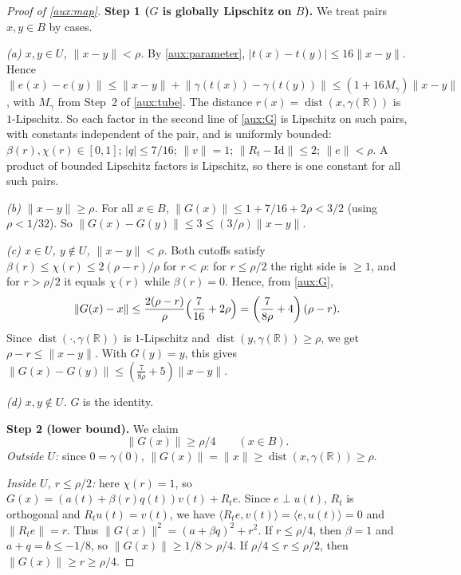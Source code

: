 \documentclass[11pt]{article}
\newcommand{\R}{\mathbb R}
\newcommand{\norm}[1]{\lVert #1\rVert}
\newcommand{\ip}[2]{\langle #1,#2\rangle}
\DeclareMathOperator{\dist}{dist}
\theoremstyle{definition}
\numberwithin{equation}{section}
\newcommand{\step}[1]{\par\smallskip\noindent\textbf{Step #1.}\enspace}
\begin{document}
\begin{proof}[Proof of \cref{aux:map}]
\step{1 (\(G\) is globally Lipschitz on \(B\))}
We treat pairs \(x,y\in B\) by cases.

\emph{(a) \(x,y\in U\), \(\norm{x-y}<\rho\).} By \eqref{aux:parameter},
\(|t(x)-t(y)|\le16\norm{x-y}\). Hence
\(\norm{e(x)-e(y)}\le\norm{x-y}+\norm{\gamma(t(x))-\gamma(t(y))}
\le(1+16M_\gamma)\norm{x-y}\), with \(M_\gamma\) from Step~2 of
\cref{aux:tube}. The distance \(r(x)=\dist(x,\gamma(\R))\) is
\(1\)-Lipschitz. So each factor in the second line of \eqref{aux:G} is
Lipschitz on such pairs, with constants independent of the pair, and is
uniformly bounded: \(\beta(r),\chi(r)\in[0,1]\); \(|q|\le7/16\);
\(\norm v=1\); \(\norm{R_t-\mathrm{Id}}\le2\); \(\norm e<\rho\). A product
of bounded Lipschitz factors is Lipschitz, so there is one constant for all
such pairs.

\emph{(b) \(\norm{x-y}\ge\rho\).} For all \(x\in B\),
\(\norm{G(x)}\le1+7/16+2\rho<3/2\) (using \(\rho<1/32\)). So
\(\norm{G(x)-G(y)}\le3\le(3/\rho)\norm{x-y}\).

\emph{(c) \(x\in U\), \(y\notin U\), \(\norm{x-y}<\rho\).}
Both cutoffs satisfy \(\beta(r)\le\chi(r)\le2(\rho-r)/\rho\) for
\(r<\rho\): for \(r\le\rho/2\) the right side is \(\ge1\), and for
\(r>\rho/2\) it equals \(\chi(r)\) while \(\beta(r)=0\). Hence, from
\eqref{aux:G},
\[
 \norm{G(x)-x}\le\frac{2(\rho-r)}{\rho}\Bigl(\frac7{16}+2\rho\Bigr)
 =\left(\frac{7}{8\rho}+4\right)(\rho-r).
\]
Since \(\dist(\cdot,\gamma(\R))\) is \(1\)-Lipschitz and
\(\dist(y,\gamma(\R))\ge\rho\), we get \(\rho-r\le\norm{x-y}\). With
\(G(y)=y\), this gives
\(\norm{G(x)-G(y)}\le(\tfrac7{8\rho}+5)\norm{x-y}\).

\emph{(d) \(x,y\notin U\).} \(G\) is the identity.

\step{2 (lower bound)}
We claim
\begin{equation}\label{aux:nonzero}
 \norm{G(x)}\ge\rho/4\qquad(x\in B).
\end{equation}
\emph{Outside \(U\):} since \(0=\gamma(0)\),
\(\norm{G(x)}=\norm x\ge\dist(x,\gamma(\R))\ge\rho\).

\emph{Inside \(U\), \(r\le\rho/2\):} here \(\chi(r)=1\), so
\(G(x)=(a(t)+\beta(r)q(t))v(t)+R_te\). Since \(e\perp u(t)\), \(R_t\) is
orthogonal and \(R_tu(t)=v(t)\), we have
\(\ip{R_te}{v(t)}=\ip{e}{u(t)}=0\) and \(\norm{R_te}=r\). Thus
\(\norm{G(x)}^2=(a+\beta q)^2+r^2\). If \(r\le\rho/4\), then \(\beta=1\)
and \(a+q=b\le-1/8\), so \(\norm{G(x)}\ge1/8>\rho/4\). If
\(\rho/4\le r\le\rho/2\), then \(\norm{G(x)}\ge r\ge\rho/4\).


\end{proof}
\end{document}
